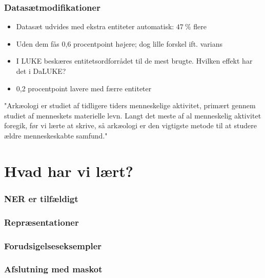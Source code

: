 \documentclass{beamer}
\newcommand{\unit}[1]{\ensuremath{\:\text{#1}}}
\newcommand{\pro}{\ensuremath{\unit{\%{}}}}
\begin{document}
\begin{frame}
    \frametitle{Datasætmodifikationer}
    \begin{itemize}
        \item Datasæt udvides med ekstra entiteter automatisk: $ 47\pro $ flere
        \item Uden dem fås 0,6 procentpoint højere; dog lille forskel ift. varians
        \item I LUKE beskæres entitetsordforrådet til de mest brugte. Hvilken effekt har det i DaLUKE?
        \item 0,2 procentpoint lavere med færre entiteter
    \end{itemize}
    \begin{example}
        "Arkæologi er studiet af tidligere tiders {\color{red}menneske}lige {\color{red}aktivitet}, primært gennem studiet af {menneske}ts materielle levn. Langt det meste af al {menneske}lig {\color{red}aktivitet} foregik, før vi lærte at skrive, så {arkæologi} er den vigtigste metode til at studere ældre {menneske}skabte samfund."
    \end{example}
\end{frame}

\section{Hvad har vi lært?}

\begin{frame}
    \frametitle{NER er tilfældigt}
\end{frame}

\begin{frame}
    \frametitle{Repræsentationer}
\end{frame}

\begin{frame}
    \frametitle{Forudsigelseseksempler}
\end{frame}

\begin{frame}
    \frametitle{Afslutning med maskot}
\end{frame}
\end{document}

